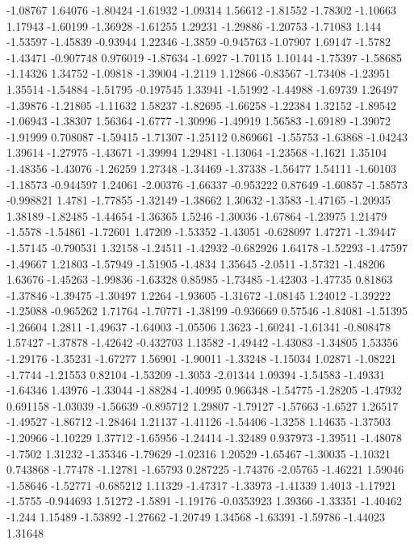 \documentclass[9pt]{article}
\theoremstyle{plain}
\theoremstyle{definition}
\theoremstyle{remark}
\numberwithin{equation}{section}
\begin{document}
-1.08767
1.64076
-1.80424
-1.61932
-1.09314
1.56612
-1.81552
-1.78302
-1.10663
1.17943
-1.60199
-1.36928
-1.61255
1.29231
-1.29886
-1.20753
-1.71083
1.144
-1.53597
-1.45839
-0.93944
1.22346
-1.3859
-0.945763
-1.07907
1.69147
-1.5782
-1.43471
-0.907748
0.976019
-1.87634
-1.6927
-1.70115
1.10144
-1.75397
-1.58685
-1.14326
1.34752
-1.09818
-1.39004
-1.2119
1.12866
-0.83567
-1.73408
-1.23951
1.35514
-1.54884
-1.51795
-0.197545
1.33941
-1.51992
-1.44988
-1.69739
1.26497
-1.39876
-1.21805
-1.11632
1.58237
-1.82695
-1.66258
-1.22384
1.32152
-1.89542
-1.06943
-1.38307
1.56364
-1.6777
-1.30996
-1.49919
1.56583
-1.69189
-1.39072
-1.91999
0.708087
-1.59415
-1.71307
-1.25112
0.869661
-1.55753
-1.63868
-1.04243
1.39614
-1.27975
-1.43671
-1.39994
1.29481
-1.13064
-1.23568
-1.1621
1.35104
-1.48356
-1.43076
-1.26259
1.27348
-1.34469
-1.37338
-1.56477
1.54111
-1.60103
-1.18573
-0.944597
1.24061
-2.00376
-1.66337
-0.953222
0.87649
-1.60857
-1.58573
-0.998821
1.4781
-1.77855
-1.32149
-1.38662
1.30632
-1.3583
-1.47165
-1.20935
1.38189
-1.82485
-1.44654
-1.36365
1.5246
-1.30036
-1.67864
-1.23975
1.21479
-1.5578
-1.54861
-1.72601
1.47209
-1.53352
-1.43051
-0.628097
1.47271
-1.39447
-1.57145
-0.790531
1.32158
-1.24511
-1.42932
-0.682926
1.64178
-1.52293
-1.47597
-1.49667
1.21803
-1.57949
-1.51905
-1.4834
1.35645
-2.0511
-1.57321
-1.48206
1.63676
-1.45263
-1.99836
-1.63328
0.85985
-1.73485
-1.42303
-1.47735
0.81863
-1.37846
-1.39475
-1.30497
1.2264
-1.93605
-1.31672
-1.08145
1.24012
-1.39222
-1.25088
-0.965262
1.71764
-1.70771
-1.38199
-0.936669
0.57546
-1.84081
-1.51395
-1.26604
1.2811
-1.49637
-1.64003
-1.05506
1.3623
-1.60241
-1.61341
-0.808478
1.57427
-1.37878
-1.42642
-0.432703
1.13582
-1.49442
-1.43083
-1.34805
1.53356
-1.29176
-1.35231
-1.67277
1.56901
-1.90011
-1.33248
-1.15034
1.02871
-1.08221
-1.7744
-1.21553
0.82104
-1.53209
-1.3053
-2.01344
1.09394
-1.54583
-1.49331
-1.64346
1.43976
-1.33044
-1.88284
-1.40995
0.966348
-1.54775
-1.28205
-1.47932
0.691158
-1.03039
-1.56639
-0.895712
1.29807
-1.79127
-1.57663
-1.6527
1.26517
-1.49527
-1.86712
-1.28464
1.21137
-1.41126
-1.54406
-1.3258
1.14635
-1.37503
-1.20966
-1.10229
1.37712
-1.65956
-1.24414
-1.32489
0.937973
-1.39511
-1.48078
-1.7502
1.31232
-1.35346
-1.79629
-1.02316
1.20529
-1.65467
-1.30035
-1.10321
0.743868
-1.77478
-1.12781
-1.65793
0.287225
-1.74376
-2.05765
-1.46221
1.59046
-1.58646
-1.52771
-0.685212
1.11329
-1.47317
-1.33973
-1.41339
1.4013
-1.17921
-1.5755
-0.944693
1.51272
-1.5891
-1.19176
-0.0353923
1.39366
-1.33351
-1.40462
-1.244
1.15489
-1.53892
-1.27662
-1.20749
1.34568
-1.63391
-1.59786
-1.44023
1.31648
\end{document}
